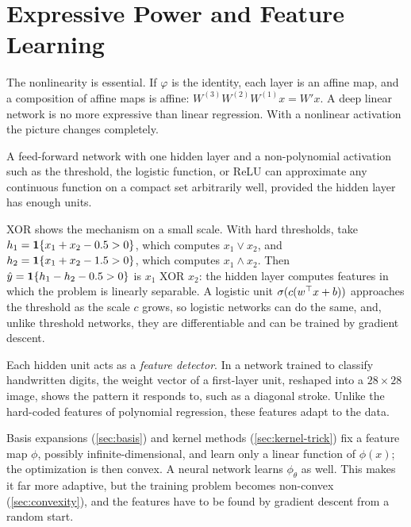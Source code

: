 \section{Expressive Power and Feature Learning}\label{sec:nn-expressivity}

The nonlinearity is essential. If $\varphi$ is the identity, each layer is an affine map, and a composition of affine maps is affine: $W^{(3)}W^{(2)}W^{(1)}x=W'x$. A deep linear network is no more expressive than linear regression. With a nonlinear activation the picture changes completely.

\begin{theorem}\label{thm:universal}
A feed-forward network with one hidden layer and a non-polynomial activation such as the threshold, the logistic function, or ReLU can approximate any continuous function on a compact set arbitrarily well, provided the hidden layer has enough units.
\end{theorem}

XOR shows the mechanism on a small scale. With hard thresholds, take $h_1=\mathbf{1}\{x_1+x_2-0.5>0\}$, which computes $x_1\vee x_2$, and $h_2=\mathbf{1}\{x_1+x_2-1.5>0\}$, which computes $x_1\wedge x_2$. Then $\hat y=\mathbf{1}\{h_1-h_2-0.5>0\}$ is $x_1$ XOR $x_2$: the hidden layer computes features in which the problem is linearly separable. A logistic unit $\sigma(c(w^{\top} x+b))$ approaches the threshold as the scale $c$ grows, so logistic networks can do the same, and, unlike threshold networks, they are differentiable and can be trained by gradient descent.

Each hidden unit acts as a \emph{feature detector}. In a network trained to classify handwritten digits, the weight vector of a first-layer unit, reshaped into a $28\times28$ image, shows the pattern it responds to, such as a diagonal stroke. Unlike the hard-coded features of polynomial regression, these features adapt to the data.

\begin{remark}
Basis expansions (\cref{sec:basis}) and kernel methods (\cref{sec:kernel-trick}) fix a feature map $\phi$, possibly infinite-dimensional, and learn only a linear function of $\phi(x)$; the optimization is then convex. A neural network learns $\phi_\theta$ as well. This makes it far more adaptive, but the training problem becomes non-convex (\cref{sec:convexity}), and the features have to be found by gradient descent from a random start.
\end{remark}

